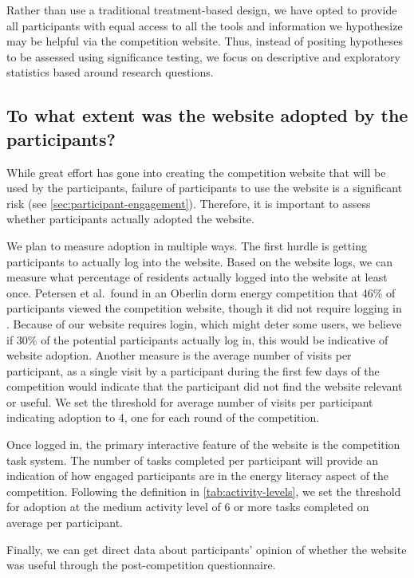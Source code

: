 Rather than use a traditional treatment-based design, we have opted to provide all participants with equal access to all the tools and information we hypothesize may be helpful via the competition website. Thus, instead of positing hypotheses to be assessed using significance testing, we focus on descriptive and exploratory statistics based around research questions.

\subsection{To what extent was the website adopted by the participants?}
\label{sec:adoption}

While great effort has gone into creating the competition website that will be used by the participants, failure of participants to use the website is a significant risk (see \autoref{sec:participant-engagement}). Therefore, it is important to assess whether participants actually adopted the website.

We plan to measure adoption in multiple ways. The first hurdle is getting participants to actually log into the website. Based on the website logs, we can measure what percentage of residents actually logged into the website at least once. Petersen et al.\ found in an Oberlin dorm energy competition that 46\% of participants viewed the competition website, though it did not require logging in \cite{petersen-dorm-energy-reduction}. Because of our website requires login, which might deter some users, we believe if 30\% of the potential participants actually log in, this would be indicative of website adoption. Another measure is the average number of visits per participant, as a single visit by a participant during the first few days of the competition would indicate that the participant did not find the website relevant or useful. We set the threshold for average number of visits per participant indicating adoption to 4, one for each round of the competition.

Once logged in, the primary interactive feature of the website is the competition task system. The number of tasks completed per participant will provide an indication of how engaged participants are in the energy literacy aspect of the competition. Following the definition in \autoref{tab:activity-levels}, we set the threshold for adoption at the medium activity level of 6 or more tasks completed on average per participant.

Finally, we can get direct data about participants' opinion of whether the website was useful through the post-competition questionnaire.

